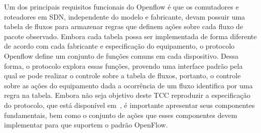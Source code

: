 \documentclass[	12pt, Times, openright, twoside, a4paper, english, brazil]{abntex2}
\begin{document}

Um dos principais requisitos funcionais do Openflow é que os comutadores e roteadores em SDN, independente do modelo e fabricante, devam possuir uma tabela de fluxos para armazenar regras que definem ações sobre cada fluxo de pacote observado. Embora cada tabela possa ser implementada de forma diferente de acordo com cada fabricante e especificação do equipamento, o protocolo Openflow define um conjunto de funções comuns em cada dispositivo. Dessa forma, o protocolo explora essas funções, provendo uma interface padrão pela qual se pode realizar o controle sobre a tabela de fluxos, portanto, o controle sobre as ações do equipamento dada a ocorrência de um fluxo identifica por uma regra na tabela. Embora não seja objetivo deste TCC reproduzir a especificação do protocolo, que está disponível em~\cite{OFSespec}, é importante apresentar seus componentes fundamentais, bem como o conjunto de ações que esses componentes devem implementar para que suportem o padrão OpenFlow.
\end{document}
